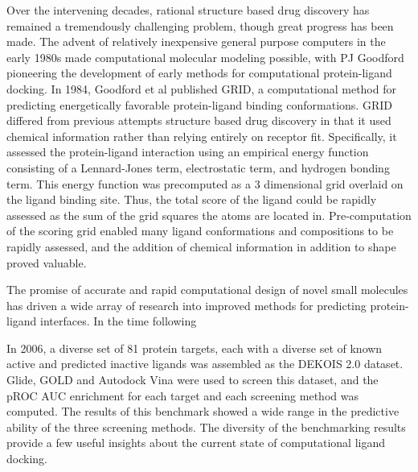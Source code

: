 Over the intervening decades, rational structure based drug discovery has remained a tremendously challenging problem, though great progress has been made.
The advent of relatively inexpensive general purpose computers in the early 1980s made computational molecular modeling possible, with PJ Goodford pioneering the development of early methods for computational protein-ligand docking.
In 1984, Goodford et al published GRID, a computational method for predicting energetically favorable protein-ligand binding conformations\citep{Goodford:1985bf}.
GRID differed from previous attempts structure based drug discovery in that it used chemical information rather than relying entirely on receptor fit. 
Specifically, it assessed the protein-ligand interaction using an empirical energy function consisting of a Lennard-Jones term, electrostatic term, and hydrogen bonding term.
This energy function was precomputed as a 3 dimensional grid overlaid on the ligand binding site.
Thus, the total score of the ligand could be rapidly assessed as the sum of the grid squares the atoms are located in.
Pre-computation of the scoring grid enabled many ligand conformations and compositions to be rapidly assessed, and the addition of chemical information in addition to shape proved valuable. 

The promise of accurate and rapid computational design of novel small molecules has driven a wide array of research into improved methods for predicting protein-ligand interfaces. 
In the time following 

In 2006, a diverse set of 81 protein targets, each with a diverse set of known active and predicted inactive ligands was assembled as the DEKOIS 2.0 dataset\citep{Bauer:2013de}.
Glide, GOLD and Autodock Vina were used to screen this dataset, and the pROC AUC enrichment for each target and each screening method was computed.
The results of this benchmark showed a wide range in the predictive ability of the three screening methods.  
The diversity of the benchmarking results provide a few useful insights about the current state of computational ligand docking. 

